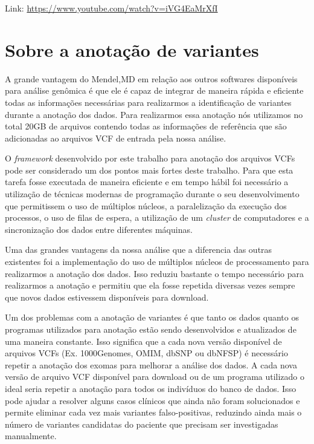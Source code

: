 Link: \url{https://www.youtube.com/watch?v=iVG4EaMrXfI}

\section{Sobre a anotação de variantes}

A grande vantagem do Mendel,MD em relação aos outros softwares disponíveis para análise genômica é que ele é capaz de integrar de maneira rápida e eficiente todas as informações necessárias para realizarmos a identificação de variantes durante a anotação dos dados. Para realizarmos essa anotação nós utilizamos no total 20GB de arquivos contendo todas as informações de referência que são adicionadas ao arquivos VCF de entrada pela nossa análise.

O \textit{framework} desenvolvido por este trabalho para anotação dos arquivos VCFs pode ser considerado um dos pontos mais fortes deste trabalho. Para que esta tarefa fosse executada de maneira eficiente e em tempo hábil foi necessário a utilização de técnicas modernas de programação durante o seu desenvolvimento que permitissem o uso de múltiplos núcleos, a paralelização da execução dos processos, o uso de filas de espera, a utilização de um \textit{cluster} de computadores e a sincronização dos dados entre diferentes máquinas.

Uma das grandes vantagens da nossa análise que a diferencia das outras existentes foi a implementação do uso de múltiplos núcleos de processamento para realizarmos a anotação dos dados. Isso reduziu bastante o tempo necessário para realizarmos a anotação e permitiu que ela fosse repetida diversas vezes sempre que novos dados estivessem disponíveis para download.

Um dos problemas com a anotação de variantes é que tanto os dados quanto os programas utilizados para anotação estão sendo desenvolvidos e atualizados de uma maneira constante. Isso significa que a cada nova versão disponível de arquivos VCFs (Ex. 1000Genomes, OMIM, dbSNP ou dbNFSP) é necessário repetir a anotação dos exomas para melhorar a análise dos dados. A cada nova versão de arquivo VCF disponível para download ou de um programa utilizado o ideal seria repetir a anotação para todos os indivíduos do banco de dados. Isso pode ajudar a resolver alguns casos clínicos que ainda não foram solucionados e permite eliminar cada vez mais variantes falso-positivas, reduzindo ainda mais o número de variantes candidatas do paciente que precisam ser investigadas manualmente.

